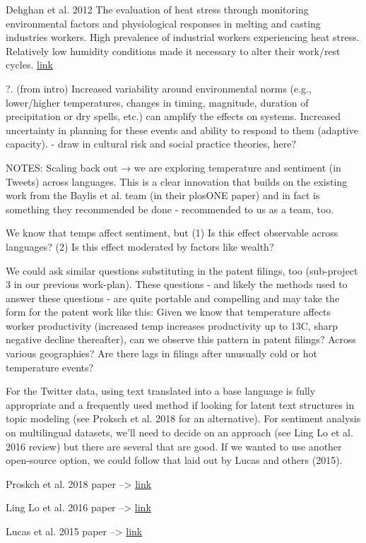 Dehghan et al. 2012  The evaluation of heat stress through monitoring environmental factors and physiological responses in melting and casting industries workers. High prevalence of industrial workers experiencing heat stress. Relatively low humidity conditions made it necessary to alter their work/rest cycles. \href{http://www.ijehe.org/article.asp?issn=2277-9183;year=2012;volume=1;issue=1;spage=21;epage=21;aulast=Dehghan}{link}

?. (from intro) Increased variability around environmental norms (e.g., lower/higher temperatures, changes in timing, magnitude, duration of precipitation or dry spells, etc.) can amplify the effects on systems. Increased uncertainty in planning for these events and ability to respond to them (adaptive capacity). - draw in cultural risk and social practice theories, here?

NOTES: Scaling back out → we are exploring temperature and sentiment (in Tweets) across languages. This is a clear innovation that builds on the existing work from the Baylis et al. team (in their plosONE paper) and in fact is something they recommended be done - recommended to us as a team, too.

We know that temps affect sentiment, but (1) Is this effect observable across languages? (2) Is this effect moderated by factors like wealth?

We could ask similar questions substituting in the patent filings, too (sub-project 3 in our previous work-plan). These questions - and likely the methods used to answer these questions - are quite portable and compelling and may take the form for the patent work like this: Given we know that temperature affects worker productivity (increased temp increases productivity up to 13C, sharp negative decline thereafter), can we observe this pattern in patent filings? Across various geographies? Are there lags in filings after unusually cold or hot temperature events?

For the Twitter data, using text translated into a base language is fully appropriate and a frequently used method if looking for latent text structures in topic modeling (see Proksch et al. 2018 for an alternative). For sentiment analysis on multilingual datasets, we'll need to decide on an approach (see Ling Lo et al. 2016 review) but there are several that are good. If we wanted to use another open-source option, we could follow that laid out by Lucas and others (2015).

Proskch et al. 2018 paper --> \href{https://onlinelibrary.wiley.com/doi/full/10.1111/lsq.12218}{link} 

Ling Lo et al. 2016 paper --> \href{https://link.springer.com/article/10.1007/s10462-016-9508-4}{link} 

Lucas et al. 2015 paper --> \href{https://www.cambridge.org/core/journals/political-analysis/article/computerassisted-text-analysis-for-comparative-politics/CC8B2CF63A8CC36FE00A13F9839F92BB}{link}
 





